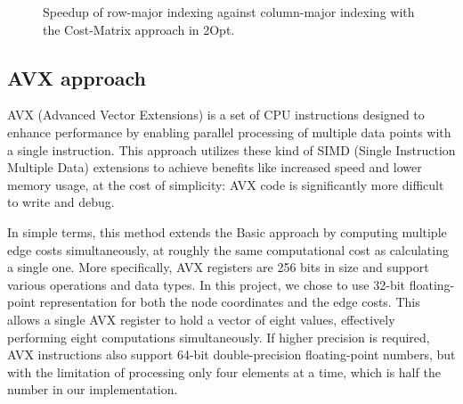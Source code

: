 \begin{figure}[htbp]
    \centering
    \caption{Speedup of row-major indexing against column-major indexing with the Cost-Matrix approach in 2Opt.} \label{fig:matrixBadIndex}
\end{figure}

\subsection{AVX approach}

AVX (Advanced Vector Extensions)\cite{avxWikipedia} is a set of CPU instructions designed to enhance performance by enabling parallel processing of multiple data points with a single instruction.
This approach utilizes these kind of SIMD (Single Instruction Multiple Data) extensions to achieve benefits like increased speed and lower memory usage, at the cost of simplicity: AVX code is significantly more difficult to write and debug.

In simple terms, this method extends the Basic approach by computing multiple edge costs simultaneously, at roughly the same computational cost as calculating a single one.
More specifically, AVX registers are 256 bits in size and support various operations and data types. 
In this project, we chose to use 32-bit floating-point representation for both the node coordinates and the edge costs.
This allows a single AVX register to hold a vector of eight values, effectively performing eight computations simultaneously.
If higher precision is required, AVX instructions also support 64-bit double-precision floating-point numbers, but with the limitation of processing only four elements at a time, which is half the number in our implementation.

